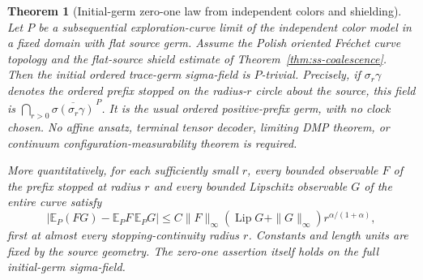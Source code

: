 \documentclass[11pt]{article}
\newtheorem{theorem}{Theorem}[section]
\theoremstyle{definition}\newtheorem{definition}[theorem]{Definition}
\theoremstyle{remark}\newtheorem{remark}[theorem]{Remark}
\begin{document}
\begin{theorem}[Initial-germ zero-one law from independent colors and shielding]
\label{thm:ed-germzeroone}
Let $P$ be a subsequential exploration-curve limit of the independent
color model in a fixed domain with flat source germ. Assume the Polish
oriented Fr\'echet curve topology and the flat-source shield estimate of
Theorem~\ref{thm:ss-coalescence}. Then the initial ordered trace-germ
sigma-field is $P$-trivial. Precisely, if $\sigma_r\gamma$ denotes the
ordered prefix stopped on the radius-$r$ circle about the source, this
field is $\bigcap_{r>0}\overline{\sigma(\sigma_r\gamma)}^{\,P}$.
It is the usual ordered positive-prefix germ, with no clock chosen.
No affine ansatz, terminal tensor decoder,
limiting DMP theorem, or continuum configuration-measurability theorem
is required.

More quantitatively, for each sufficiently small $r$, every bounded
observable $F$ of the prefix stopped at radius $r$ and every bounded
Lipschitz observable $G$ of the entire curve satisfy
\[
 \left|\mathbb E_P(FG)-\mathbb E_PF\,\mathbb E_PG\right|
 \leq C\|F\|_\infty
   (\operatorname{Lip}G+\|G\|_\infty)r^{\alpha/(1+\alpha)},
 \tag{EDG}
\]
first at almost every stopping-continuity radius $r$. Constants and
length units are fixed by the source geometry. The zero-one assertion
itself holds on the full initial-germ sigma-field.
\end{theorem}
\end{document}
